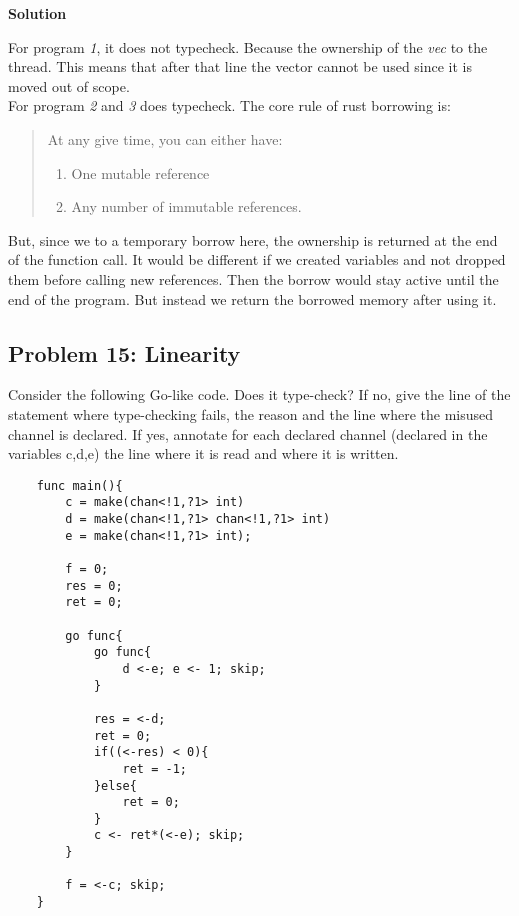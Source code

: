 \textbf{Solution}

For program \textit{1}, it does not typecheck. Because the ownership of the \textit{vec} to the thread. 
This means that after that line the vector cannot be used since it is moved out of scope. \\

For program \textit{2} and \textit{3} does typecheck. The core rule of rust borrowing is: 
\begin{quote}
    At any give time, you can either have:
    \begin{enumerate}
        \item One mutable reference 
        \item Any number of immutable references. 
    \end{enumerate}
\end{quote}

But, since we to a temporary borrow here, the ownership is returned at the end of the function call. It would be different if we created variables and not dropped them before calling new references. 
Then the borrow would stay active until the end of the program. But instead we return the borrowed memory after using it. 


\subsection{Problem 15: Linearity}

Consider the following Go-like code. Does it type-check? If no,
give the line of the statement where type-checking fails, the reason and the line where the
misused channel is declared. If yes, annotate for each declared channel (declared in the variables
c,d,e) the line where it is read and where it is written.

\begin{lstlisting}
    func main(){
        c = make(chan<!1,?1> int)
        d = make(chan<!1,?1> chan<!1,?1> int)
        e = make(chan<!1,?1> int);

        f = 0; 
        res = 0; 
        ret = 0; 

        go func{
            go func{
                d <-e; e <- 1; skip;
            }

            res = <-d;
            ret = 0; 
            if((<-res) < 0){
                ret = -1;
            }else{
                ret = 0; 
            }
            c <- ret*(<-e); skip;
        }

        f = <-c; skip;
    }
\end{lstlisting}

